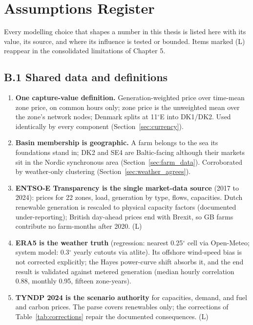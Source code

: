 \section{Assumptions Register}\label{app:assumptions}

Every modelling choice that shapes a number in this thesis is listed here
with its value, its source, and where its influence is tested or bounded.
Items marked (L) reappear in the consolidated limitations of Chapter 5.

\subsection*{B.1 Shared data and definitions}

\begin{enumerate}
    \item \textbf{One capture-value definition.} Generation-weighted price
    over time-mean zone price, on common hours only; zone price is the
    unweighted mean over the zone's network nodes; Denmark splits at
    11$^{\circ}$E into DK1/DK2. Used identically by every component
    (Section~\ref{sec:currency}).
    \item \textbf{Basin membership is geographic.} A farm belongs to the sea
    its foundations stand in; DK2 and SE4 are Baltic-facing although their
    markets sit in the Nordic synchronous area
    (Section~\ref{sec:farm_data}). Corroborated by weather-only clustering
    (Section~\ref{sec:weather_agrees}).
    \item \textbf{ENTSO-E Transparency is the single market-data source}
    (2017 to 2024): prices for 22 zones, load, generation by type, flows,
    capacities. Dutch renewable generation is rescaled to physical capacity
    factors (documented under-reporting); British day-ahead prices end with
    Brexit, so GB farms contribute no farm-months after 2020. (L)
    \item \textbf{ERA5 is the weather truth} (regression: nearest
    0.25$^{\circ}$ cell via Open-Meteo; system model: 0.3$^{\circ}$ yearly
    cutouts via atlite). Its offshore wind-speed bias is not corrected
    explicitly; the Hayes power-curve shift absorbs it, and the end result
    is validated against metered generation (median hourly correlation
    0.88, monthly 0.95, fifteen zone-years).
    \item \textbf{TYNDP 2024 is the scenario authority} for capacities,
    demand, and fuel and carbon prices. The parse covers renewables only;
    the corrections of Table~\ref{tab:corrections} repair the documented
    consequences. (L)
\end{enumerate}

